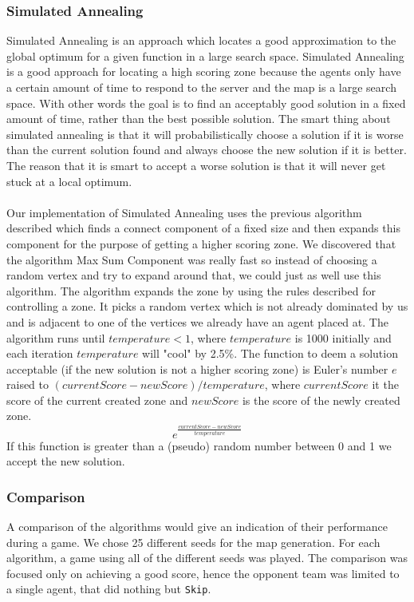 \documentclass[11pt]{article}
\begin{document}
\subsubsection{Simulated Annealing}
Simulated Annealing is an approach which locates a good approximation to the global optimum for a given function in a large search space. Simulated Annealing is a good approach for locating a high scoring zone because the agents only have a certain amount of time to respond to the server and the map is a large search space. With other words the goal is to find an acceptably good solution in a fixed amount of time, rather than the best possible solution. The smart thing about simulated annealing is that it will probabilistically choose a solution if it is worse than the current solution found and always choose the new solution if it is better. The reason that it is smart to accept a worse solution is that it will never get stuck at a local optimum.\\
\\
Our implementation of Simulated Annealing uses the previous algorithm described which finds a connect component of a fixed size and then expands this component for the purpose of getting a higher scoring zone. We discovered that the algorithm Max Sum Component was really fast so instead of choosing a random vertex and try to expand around that, we could just as well use this algorithm. The algorithm expands the zone by using the rules described for controlling a zone. It picks a random vertex which is not already dominated by us and is adjacent to one of the vertices we already have an agent placed at. The algorithm runs until $temperature < 1$, where $temperature$ is 1000 initially and each iteration $temperature$ will "cool" by 2.5\%. The function to deem a solution acceptable (if the new solution is not a higher scoring zone) is Euler's number $e$ raised to $(currentScore - newScore) / temperature$, where $currentScore$ it the score of the current created zone and $newScore$ is the score of the newly created zone.
$$e^\frac{currentScore - newScore}{temperature}$$
If this function is greater than a (pseudo) random number between 0 and 1 we accept the new solution.

\subsubsection{Comparison}
A comparison of the algorithms would give an indication of their performance during a game. We chose 25 different seeds for the map generation. For each algorithm, a game using all of the different seeds was played. The comparison was focused only on achieving a good score, hence the opponent team was limited to a single agent, that did nothing but {\tt Skip}.
\end{document}

